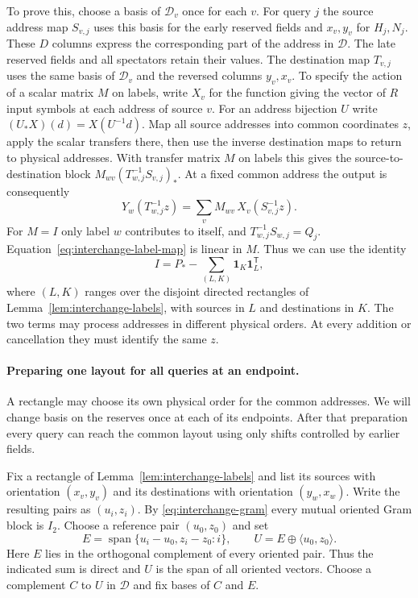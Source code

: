 To prove this, choose a basis of $\mathcal D_v$ once for each $v$. For query
$j$ the source address map $S_{v,j}$ uses this basis for the early
reserved fields and $x_v,y_v$ for $H_j,N_j$. These $D$ columns
express the corresponding part of the address in $\mathcal D$.
The late reserved fields and all spectators retain their values. The
destination map $T_{v,j}$ uses the same basis of $\mathcal D_v$ and the
reversed columns $y_v,x_v$. To specify the action of a scalar matrix
$M$ on labels, write $X_v$ for the function giving the vector of $R$ input symbols at
each address of source $v$. For an address bijection $U$ write
$(U_*X)(d)=X(U^{-1}d)$. 
Map all source addresses into common coordinates $z$, apply the
scalar transfers there, then use the inverse destination maps to return
to physical addresses. With transfer matrix $M$ on labels this gives
the source-to-destination block $M_{wv}(T_{w,j}^{-1}S_{v,j})_*$. At a
fixed common address the output is consequently
\begin{equation}\label{eq:interchange-label-map}
       Y_w(T_{w,j}^{-1}z)=\sum_v M_{wv}\,X_v(S_{v,j}^{-1}z).
\end{equation}
For $M=I$ only label $w$ contributes to itself, and
$T_{w,j}^{-1}S_{w,j}=Q_j$. Equation~\eqref{eq:interchange-label-map}
is linear in $M$. Thus we can use the identity
\[
         I=P_*-\sum_{(L,K)}\mathbf 1_K\mathbf 1_L^{\mathsf T},
\]
where $(L,K)$ ranges over the disjoint directed rectangles of
Lemma~\ref{lem:interchange-labels}, with sources in $L$ and
destinations in $K$. The two terms may process addresses in different
physical orders. At every addition or cancellation they must identify
the same $z$.

\paragraph{Preparing one layout for all queries at an endpoint.}
A rectangle may choose its own physical order for the common
addresses. We will change basis on the reserves once at each of its
endpoints. After that preparation every query can reach the common
layout using only shifts controlled by earlier fields.

Fix a rectangle of Lemma~\ref{lem:interchange-labels} and list its
sources with orientation $(x_v,y_v)$ and its destinations with
orientation $(y_w,x_w)$. Write the resulting pairs as $(u_i,z_i)$.
By \eqref{eq:interchange-gram} every mutual oriented Gram block is
$I_2$. Choose a reference pair $(u_0,z_0)$ and set
\[
    E=\operatorname{span}\{u_i-u_0,z_i-z_0:i\},\qquad
    U=E\oplus\langle u_0,z_0\rangle .
\]
Here $E$ lies in the orthogonal complement of every oriented pair.
Thus the indicated sum is direct and $U$ is the span of all oriented
vectors. Choose a complement $C$ to $U$ in $\mathcal D$ and fix bases
of $C$ and $E$.

